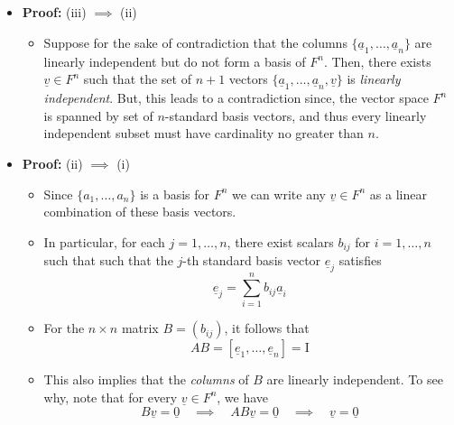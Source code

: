 \documentclass[11pt,twoside]{report}
\newcommand{\vecnot}{\underline}
\newcommand{\Id}{{\mathrm{I}}}
\begin{document}
\begin{itemize}
\item \textbf{Proof:} (iii) $\implies$ (ii)
\begin{itemize}

\item Suppose for the sake of contradiction that the columns $\{\vecnot{a}_1, \dots, \vecnot{a}_n\}$ are linearly independent but do not form a basis of $F^n$. Then, there exists $\vecnot{v} \in F^n$ such that the set of $n+1$ vectors  $\{\vecnot{a}_1, \dots, \vecnot{a}_n, \vecnot{v}\}$ is \emph{linearly independent}. But, this leads to a contradiction since, the  vector space  $F^n$ is spanned by set of  $n$-standard basis vectors, and thus every linearly independent subset must have cardinality no greater than $n$. 


\end{itemize}



\item \textbf{Proof:} (ii) $\implies$ (i)
\begin{itemize}
\item  Since $\{a_1, \dots, a_n\}$ is a basis for $F^n$ we can write any $\vecnot{v} \in F^n$ as a linear combination of these basis vectors. 

\item  In particular, for  each $j = 1, \dots, n$, there exist scalars $b_{ij}$ for $i = 1, \dots , n$ such that 
  such that the $j$-th standard basis vector $\vecnot{e}_j$ satisfies
\[
\vecnot{e}_j = \sum_{i=1}^n b_{ij} \vecnot{a}_i
\]

\item For the $n \times n$ matrix $B = (b_{ij})$, it follows that
\[
A B  = [ \vecnot{e}_1, \dots, \vecnot{e}_n] = \Id
\]

\item 
This also implies that the \emph{columns} of $B$ are linearly independent. To see why, note that  for every $\vecnot{v} \in F^n$, we have
\[
B \vecnot{v} = \vecnot{0}  \quad \implies \quad  A B\vecnot{v} =  \vecnot{0}  \quad \implies \quad \vecnot{v} =  \vecnot{0} 
\]


\end{itemize}
\end{itemize}
\end{document}
